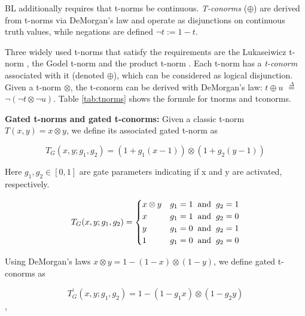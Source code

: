 \noindent BL additionally requires that t-norms be continuous. \textit{T-conorms} ($\oplus$) are derived from t-norms via DeMorgan’s law and operate as disjunctions on continuous truth values, while negations are defined $\neg{t} := 1 - t$.

\noindent Three widely used t-norms that satisfy the requirements are the
Lukaseiwicz t-norm \cite{luka}, the Godel t-norm \cite{baaz1996} and the product t-norm \cite{hajek1996}. Each t-norm has a \textit{t-conorm} associated with it (denoted $\oplus$), which can be
considered as logical disjunction. Given a t-norm $\otimes$, the t-conorm can be derived with DeMorgan’s
law: $t \oplus u$ $\overset{\Delta}{=}$ $\neg{(\neg{t} \otimes \neg{u})}$. Table \ref{tab:tnorms} shows the formule for tnorms and tconorms.



\noindent\textbf{Gated t-norms and gated t-conorms:} Given a classic t-norm $T(x, y) = x \otimes y$, we define its associated gated t-norm as 

$$T_{G}(x,y;g_{1},g_{2}) = (1 + g_{1}(x - 1)) \otimes (1 + g_{2}(y - 1))$$

Here $g_{1}, g_{2} \in [0, 1]$ are gate parameters indicating if x and y are activated, respectively.

\[
    T_{G}(x,y;g_{1},g_{2})= 
\begin{cases}
    x \otimes y & g_{1} = 1 \hspace{2mm} \text{and} \hspace{2mm} g_{2} = 1\\
    x & g_{1} = 1 \hspace{2mm} \text{and} \hspace{2mm} g_{2} = 0\\
    y & g_{1} = 0 \hspace{2mm} \text{and} \hspace{2mm} g_{2} = 1\\
    1 & g_{1} = 0 \hspace{2mm} \text{and} \hspace{2mm} g_{2} = 0
\end{cases}
\]

Using DeMorgan’s laws $x \otimes y = 1 - (1 - x) \otimes (1 - y)$, we define gated t-conorms as

$$T_{G}^{'}(x,y;g_{1},g_{2}) = 1 - (1 - g_{1}x) \otimes (1 - g_{2}y)$$,

